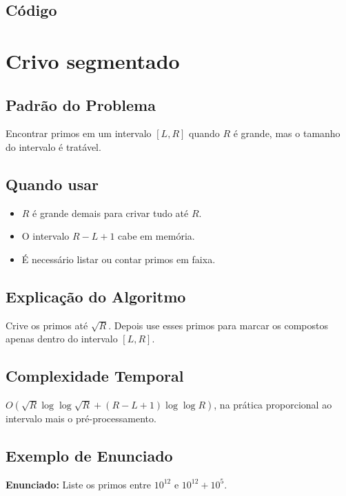 \subsection{Código}

\section{Crivo segmentado}

\subsection{Padrão do Problema}
Encontrar primos em um intervalo $[L,R]$ quando $R$ é grande, mas o tamanho do intervalo é tratável.

\subsection{Quando usar}
\begin{itemize}[nosep]
  \item $R$ é grande demais para crivar tudo até $R$.
  \item O intervalo $R-L+1$ cabe em memória.
  \item É necessário listar ou contar primos em faixa.
\end{itemize}

\subsection{Explicação do Algoritmo}
Crive os primos até $\sqrt R$. Depois use esses primos para marcar os compostos apenas dentro do intervalo $[L,R]$.

\subsection{Complexidade Temporal}
$O(\sqrt R\log\log\sqrt R + (R-L+1)\log\log R)$, na prática proporcional ao intervalo mais o pré-processamento.

\subsection{Exemplo de Enunciado}
\begin{exemplodiabox}
\textbf{Enunciado:} Liste os primos entre $10^{12}$ e $10^{12}+10^5$.
\end{exemplodiabox}

